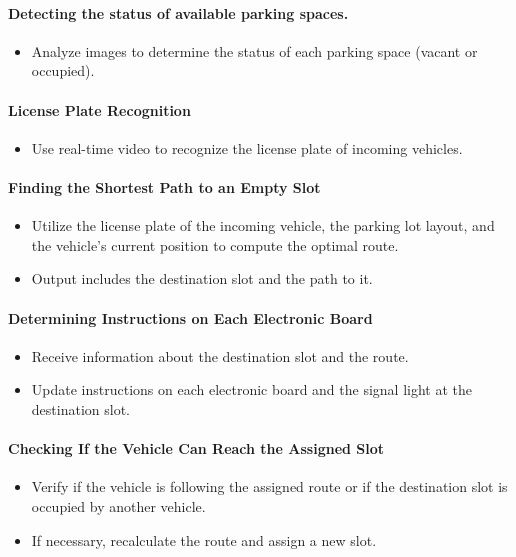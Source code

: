 \documentclass{article}
\begin{document}
\begin{itemize}[label=-]
    \paragraph{Detecting the status of available parking spaces.}
    \begin{itemize}[label=-]
      \item Analyze images to determine the status of each parking space (vacant or occupied).
    \end{itemize}
    \paragraph{License Plate Recognition}
    \begin{itemize}[label=-]
        \item Use real-time video to recognize the license plate of incoming vehicles.
    \end{itemize}
    \paragraph{Finding the Shortest Path to an Empty Slot}
    \begin{itemize}[label=-]
        \item Utilize the license plate of the incoming vehicle, the parking lot layout, and the vehicle's current position to compute the optimal route.
        \item Output includes the destination slot and the path to it.
    \end{itemize}

    \paragraph{Determining Instructions on Each Electronic Board}
    \begin{itemize}[label=-]
        \item Receive information about the destination slot and the route.
        \item Update instructions on each electronic board and the signal light at the destination slot.
    \end{itemize}

    \paragraph{Checking If the Vehicle Can Reach the Assigned Slot}
    \begin{itemize}[label=-]
        \item Verify if the vehicle is following the assigned route or if the destination slot is occupied by another vehicle.
        \item If necessary, recalculate the route and assign a new slot.
    \end{itemize}


\end{itemize}
\end{document}

